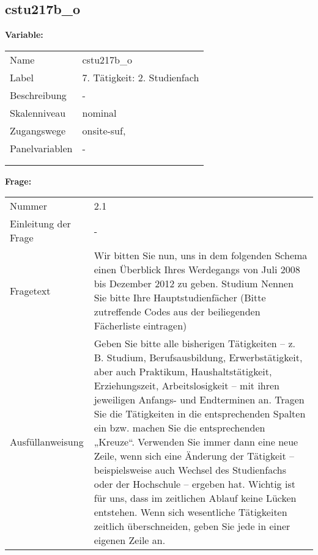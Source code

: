 	
	
	\subsection{cstu217b\_o}
	\label{subSection:cstu217b_o}

	\noindent\textbf{Variable:}\\
		\begin{tabular}{lL{11.3cm}}
			\label{tableVariable:cstu217b_o}
			Name & cstu217b\_o \\
			Label & 7. Tätigkeit: 2. Studienfach \\
			Beschreibung & - \\
			Skalenniveau & nominal \\
			Zugangswege &
				onsite-suf,
 \\
			Panelvariablen & -
			 \\
			 \\
 \\
		\end{tabular}

		\vspace*{1 cm}
		\noindent\textbf{Frage:}\\
		\begin{tabular}{lL{11.3cm}}
			\label{tableQuestion:cstu217b_o}
			Nummer & 2.1 \\
			Einleitung der Frage & - \\
			Fragetext & Wir bitten Sie nun, uns in dem folgenden Schema einen Überblick Ihres Werdegangs von Juli 2008 bis Dezember 2012 zu geben.
Studium
Nennen Sie bitte Ihre Hauptstudienfächer
(Bitte zutreffende Codes aus der beiliegenden Fächerliste eintragen) \\
			Ausfüllanweisung & Geben Sie bitte alle bisherigen Tätigkeiten – z. B. Studium, Berufsausbildung, Erwerbstätigkeit, aber auch Praktikum, Haushaltstätigkeit,
Erziehungszeit, Arbeitslosigkeit – mit ihren jeweiligen Anfangs- und Endterminen an. Tragen Sie die Tätigkeiten in die entsprechenden Spalten ein bzw. machen Sie die entsprechenden „Kreuze“. Verwenden Sie immer dann eine neue Zeile, wenn sich eine Änderung der Tätigkeit – beispielsweise auch Wechsel des Studienfachs oder der Hochschule – ergeben hat. Wichtig ist für uns, dass im zeitlichen Ablauf keine Lücken entstehen. Wenn sich wesentliche Tätigkeiten zeitlich überschneiden, geben Sie jede in einer eigenen Zeile an. \\
		\end{tabular}





